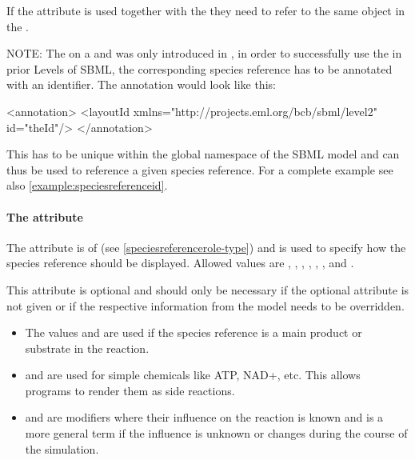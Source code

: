 If the  attribute is used together with the  
they need to refer to the same object in the \Model.

NOTE: The  on a \SpeciesReference and 
\ModifierSpeciesReference was only introduced in \sbmlthreecore, in 
order to successfully use the  in prior Levels 
of SBML, the corresponding species reference has to be annotated with an 
identifier. The annotation would look like this: 


\begin{example}
	<annotation>
		<layoutId xmlns="http://projects.eml.org/bcb/sbml/level2" id="theId"/>
	</annotation>
\end{example}

This  has to be unique within the global  
namespace of the SBML model and can thus be used to reference a given 
species reference. For a complete example see also 
\ref{example:speciesreferenceid}. 

\paragraph{The  attribute}
\label{attribute:role}
The  attribute is of  
(see \ref{speciesreferencerole-type}) and is 
used to specify how the species reference should be displayed. Allowed 
values are , , , 
, , , 
 and . 

This attribute is optional and should only be necessary if the optional 
 attribute is not given or if the respective 
information from the model needs to be overridden. 

\begin{itemize}

	\item { The values  and  are used if 
	the species reference is a main product or substrate in the reaction. } 
	\item {  and  are used for 
	simple chemicals like ATP, NAD+, etc. This allows programs to render 
	them as side reactions. } \item {  and 
	 are modifiers where their influence on the reaction is 
	known and  is a more general term if the influence is 
	unknown or changes during the course of the simulation. } 

\end{itemize}

